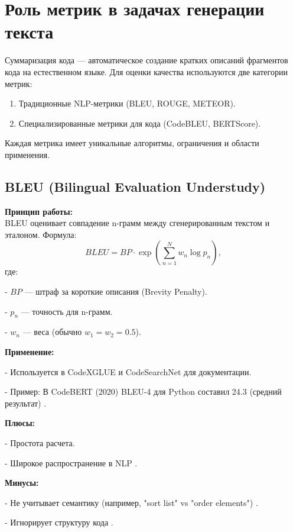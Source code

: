 \documentclass[14pt]{article}
\theoremstyle{definition}
\begin{document}
\newpage
\section{Роль метрик в задачах генерации текста}

Суммаризация кода — автоматическое создание кратких описаний фрагментов кода на естественном языке. Для оценки качества используются две категории метрик:

\begin{enumerate}
    \item Традиционные NLP-метрики (BLEU, ROUGE, METEOR).
    \item Специализированные метрики для кода (CodeBLEU, BERTScore).
\end{enumerate}

Каждая метрика имеет уникальные алгоритмы, ограничения и области применения.

\subsection{BLEU (Bilingual Evaluation Understudy)}

\textbf{Принцип работы:} \\
BLEU оценивает совпадение n-грамм между сгенерированным текстом и эталоном. Формула:
\[
BLEU = BP \cdot \exp\left(\sum_{n=1}^{N} w_n \log p_n\right),
\]
где:

    
- $BP$ — штраф за короткие описания (Brevity Penalty).
    
- $p_n$ — точность для n-грамм.
    
- $w_n$ — веса (обычно $w_1 = w_2 = 0.5$).


\textbf{Применение:}

    
- Используется в CodeXGLUE \cite{lu2021codexglue} и CodeSearchNet \cite{husain2019codesearchnet} для документации.
    
- Пример: В CodeBERT (2020) BLEU-4 для Python составил 24.3 (средний результат) \cite{feng2020codebert}.


\textbf{Плюсы:}

    
- Простота расчета.
    
- Широкое распространение в NLP \cite{chen2023}.


\textbf{Минусы:}

    
- Не учитывает семантику (например, "sort list" vs "order elements") \cite{ren2021}.
    
- Игнорирует структуру кода \cite{allamanis2019adverse}.
\end{document}
